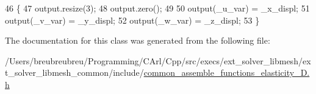 \begin{DoxyCode}
46         \{
47             output.resize(3);
48             output.zero();
49 
50             output(\_u\_var) = \_x\_displ;
51             output(\_v\_var) = \_y\_displ;
52             output(\_w\_var) = \_z\_displ;
53         \}
\end{DoxyCode}


The documentation for this class was generated from the following file\+:\begin{DoxyCompactItemize}
\item 
/\+Users/breubreubreu/\+Programming/\+C\+Arl/\+Cpp/src/execs/ext\+\_\+solver\+\_\+libmesh/ext\+\_\+solver\+\_\+libmesh\+\_\+common/include/\hyperlink{common__assemble__functions__elasticity__3_d_8h}{common\+\_\+assemble\+\_\+functions\+\_\+elasticity\+\_\+D.\+h}\end{DoxyCompactItemize}

